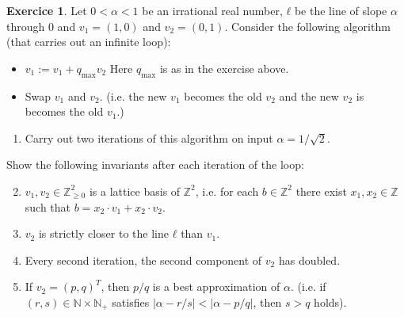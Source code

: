 \documentclass[12pt,a4paper]{article}
\theoremstyle{plain}
\newtheorem*{Sol*}{Solution}
\theoremstyle{definition}
\newtheorem{Ex}{Exercice}
\newif\ifsolutions
\newcommand{\exercise}[2]{
			\begin{Ex} #1 \end{Ex}
			\ifsolutions  \begin{Sol*} #2 \end{Sol*} \bigskip \else \bigskip  \fi
		}
\begin{document}
  \exercise{
    Let $0< α <1 $ be an irrational real number, $ℓ$ be the line of slope $α$ through  $0$ and $v_1 = (1,0)$ and $v_2 = (0,1)$.
    Consider the following algorithm (that carries out an infinite loop): 
    \begin{itemize}    
    \item $v_1 := v_1 + q_{\max} v_2$ \hfill {\scriptsize Here $q_{\max}$ is as in the exercise above.}
    \item Swap $v_1$ and $v_2$.
      \hfill 
      {\scriptsize (i.e. the new $v_1$ becomes the old $v_2$ and the new $v_2$ is becomes the old $v_1$.)} 
    \end{itemize}
    
    
    \begin{enumerate}
    \item Carry out two iterations of this algorithm on input
      $α=1/\sqrt{2}$.
    \end{enumerate}

    Show the following invariants after each iteration of the loop:
    \begin{enumerate}
      \setcounter{enumi}{1}
    \item $v_1,v_2 ∈ ℤ_{≥0}^2$ is a lattice basis of $ℤ^2$, i.e. for each $b ∈ℤ^2$ there exist $x_1,x_2 ∈ℤ$ such that $b = x_2 ⋅v_1+ x_2 ⋅v_2$.
    \item $v_2$ is strictly closer to the line $ℓ$ than $v_1$. 
    \item Every second iteration, the second component of $v_2$ has doubled.
    \item If $v_2 = (p , q)^T$, then ${p}/{q}$ is a best approximation of $α$. (i.e. if $(r,s) ∈ ℕ × ℕ_+$ satisfies $| α - r/s| < | α - p/q|$, then $s>q$ holds).   
    \end{enumerate}
    
  }{}
\end{document}

